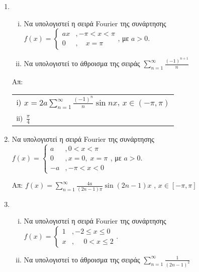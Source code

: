 



\everymath{\displaystyle}


\begin{center}
  \minibox{\large\bfseries  \textcolor{Col1}{Ασκήσεις στις Σειρές Fourier}}
\end{center}

\vspace{\baselineskip}


\begin{enumerate}
  \item 
    \begin{enumerate}[i)]
      \item Να υπολογιστεί η σειρά  Fourier  της συνάρτησης  
        $ f(x)= \begin{cases}
          ax &, - \pi < x < \pi \\
          0 &,\quad x = \pi 
        \end{cases}  $, με $ a>0 $.
      \item Να υπολογιστεί το άθροισμα της σειράς 
        $ \sum_{n=1}^{\infty} \frac{(-1)^{n+1}}{n} $
    \end{enumerate}

    \hfill Απ: \begin{tabular}{l} 
      $ \rm i)$  $ x = 2a \sum_{n=1}^{\infty} \frac{(-1)^{n}}{n} \sin{nx} $,\; 
      $ x \in (- \pi, \pi)$ \\ $ \rm ii)$ $\frac{\pi}{4} $
    \end{tabular}    

  \item Να υπολογιστεί η σειρά Fourier της συνάρτησης 
    $ f(x)= \begin{cases} 
      a &, 0<x< \pi \\
      0 &, x=0,\; x= \pi \\
      -a &, - \pi <x < 0 
    \end{cases} $, με $ a>0 $.

    \hfill Απ: $ f(x) = \sum_{n=1}^{\infty} \frac{4a}{ (2n-1)\pi} \sin{(2n-1)x}  $ ,\; 
    $ x \in [- \pi, \pi ] $

  \item 
    \begin{enumerate}[i)]
      \item Να υπολογιστεί η σειρά Fourier της συνάρτησης $f(x) = \begin{cases} 
          1 &, -2 \leq x \leq 0 \\
          x &, \phantom{-}0 < x \leq 2
        \end{cases} $.
      \item Να υπολογιστεί το άθροισμα της σειράς $ \sum_{n=1}^{\infty} 
        \frac{1}{(2n-1)^{2}} $
    \end{enumerate}


\end{enumerate}
